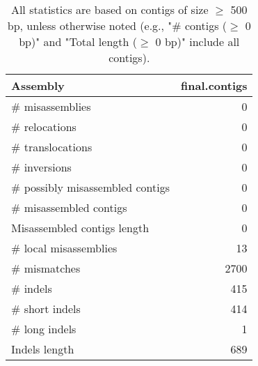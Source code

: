 \documentclass[12pt,a4paper]{article}
\begin{document}
\begin{table}[ht]
\begin{center}
\caption{All statistics are based on contigs of size $\geq$ 500 bp, unless otherwise noted (e.g., "\# contigs ($\geq$ 0 bp)" and "Total length ($\geq$ 0 bp)" include all contigs).}
\begin{tabular}{|l*{1}{|r}|}
\hline
Assembly & final.contigs \\ \hline
\# misassemblies & 0 \\ \hline
\hspace{5mm}\# relocations & 0 \\ \hline
\hspace{5mm}\# translocations & 0 \\ \hline
\hspace{5mm}\# inversions & 0 \\ \hline
\# possibly misassembled contigs & 0 \\ \hline
\# misassembled contigs & 0 \\ \hline
Misassembled contigs length & 0 \\ \hline
\# local misassemblies & 13 \\ \hline
\# mismatches & 2700 \\ \hline
\# indels & 415 \\ \hline
\hspace{5mm}\# short indels & 414 \\ \hline
\hspace{5mm}\# long indels & 1 \\ \hline
Indels length & 689 \\ \hline
\end{tabular}
\end{center}
\end{table}
\end{document}
